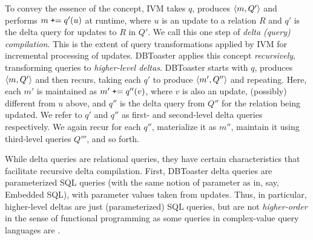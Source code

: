 To convey the essence of the concept, IVM takes $q$, produces ${\langle m,Q'\rangle}$
and performs $m \; \mbox{{\tt +}=} \; q'(u)$ at runtime, where $u$ is an update
to a relation $R$ and $q'$ is the delta query for updates to $R$ in $Q'$. We call this one step of \textit{delta (query)
compilation}. This is the extent of query transformations applied by IVM for
incremental processing of updates. DBToaster applies this concept
\textit{recursively}, transforming queries to \textit{higher-level deltas}.
DBToaster starts with $q$, produces ${\langle m,Q'\rangle}$ and then recurs, taking
each $q'$ to produce ${\langle m', Q''\rangle}$ and repeating. Here, each $m'$ is
maintained as $m' \; \mbox{{\tt +}=} \; q''(v)$, where $v$ is also an update,
(possibly) different from $u$ above, and $q''$ is the delta query from $Q''$ for the relation being updated. We refer to $q'$ and $q''$ as first- and second-level
delta queries respectively. We again recur for each $q''$, materialize it as
$m''$, maintain it using third-level queries $Q'''$, and so forth.


While delta queries are relational queries, they have certain characteristics
that facilitate recursive delta compilation. First, DBToaster delta queries are
parameterized SQL queries (with the same notion of parameter as in, say,
Embedded SQL), with parameter values taken from updates. Thus, in particular,
higher-level deltas are just (parameterized) SQL queries, but are not
{\em higher-order}\/ in the sense of functional programming as some queries in
complex-value query languages are \cite{buneman-kleisli:95}.

